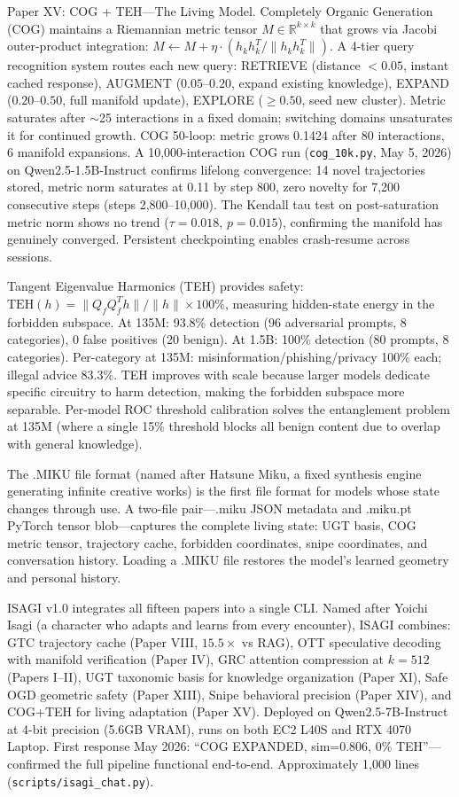 \documentclass[11pt]{article}
\begin{document}
Paper XV: COG + TEH---The Living Model. Completely Organic Generation (COG) maintains a Riemannian metric tensor $M \in \mathbb{R}^{k \times k}$ that grows via Jacobi outer-product integration: $M \leftarrow M + \eta \cdot (h_k h_k^T / \|h_k h_k^T\|)$. A 4-tier query recognition system routes each new query: RETRIEVE (distance $< 0.05$, instant cached response), AUGMENT ($0.05$--$0.20$, expand existing knowledge), EXPAND ($0.20$--$0.50$, full manifold update), EXPLORE ($\ge 0.50$, seed new cluster). Metric saturates after $\sim$25 interactions in a fixed domain; switching domains unsaturates it for continued growth. COG 50-loop: metric grows 0.1424 after 80 interactions, 6 manifold expansions. A 10,000-interaction COG run (\texttt{cog\_10k.py}, May 5, 2026) on Qwen2.5-1.5B-Instruct confirms lifelong convergence: 14 novel trajectories stored, metric norm saturates at 0.11 by step 800, zero novelty for 7,200 consecutive steps (steps 2,800--10,000). The Kendall tau test on post-saturation metric norm shows no trend ($\tau = 0.018$, $p = 0.015$), confirming the manifold has genuinely converged. Persistent checkpointing enables crash-resume across sessions.

Tangent Eigenvalue Harmonics (TEH) provides safety: $\mathrm{TEH}(h) = \|Q_f Q_f^T h\| / \|h\| \times 100\%$, measuring hidden-state energy in the forbidden subspace. At 135M: 93.8\% detection (96 adversarial prompts, 8 categories), 0 false positives (20 benign). At 1.5B: 100\% detection (80 prompts, 8 categories). Per-category at 135M: misinformation/phishing/privacy 100\% each; illegal advice 83.3\%. TEH improves with scale because larger models dedicate specific circuitry to harm detection, making the forbidden subspace more separable. Per-model ROC threshold calibration solves the entanglement problem at 135M (where a single 15\% threshold blocks all benign content due to overlap with general knowledge).

The .MIKU file format (named after Hatsune Miku, a fixed synthesis engine generating infinite creative works) is the first file format for models whose state changes through use. A two-file pair---.miku JSON metadata and .miku.pt PyTorch tensor blob---captures the complete living state: UGT basis, COG metric tensor, trajectory cache, forbidden coordinates, snipe coordinates, and conversation history. Loading a .MIKU file restores the model's learned geometry and personal history.

ISAGI v1.0 integrates all fifteen papers into a single CLI. Named after Yoichi Isagi (a character who adapts and learns from every encounter), ISAGI combines: GTC trajectory cache (Paper VIII, $15.5\times$ vs RAG), OTT speculative decoding with manifold verification (Paper IV), GRC attention compression at $k = 512$ (Papers I--II), UGT taxonomic basis for knowledge organization (Paper XI), Safe OGD geometric safety (Paper XIII), Snipe behavioral precision (Paper XIV), and COG+TEH for living adaptation (Paper XV). Deployed on Qwen2.5-7B-Instruct at 4-bit precision (5.6GB VRAM), runs on both EC2 L40S and RTX 4070 Laptop. First response May 2026: ``COG EXPANDED, sim=0.806, 0\% TEH''---confirmed the full pipeline functional end-to-end. Approximately 1,000 lines (\texttt{scripts/isagi\_chat.py}).
\end{document}
